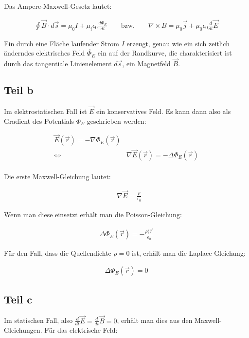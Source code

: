 \documentclass[a4paper,german,12pt,smallheadings]{scrartcl}
\begin{document}
Das Ampere-Maxwell-Gesetz lautet:

\begin{align*}
  \oint \vec{B} \cdot d\vec{s} = \mu_0 I + \mu_i \epsilon_0 \frac{d\Phi_{E}}{dt} \qquad\text{bzw.}\qquad \nabla \times B = \mu_0 \vec{j} + \mu_0 \epsilon_0 \frac{d}{dt} \vec{E}
\end{align*}

Ein durch eine Fläche laufender Strom $I$ erzeugt, genau wie ein sich zeitlich
änderndes elektrisches Feld $\dot{\Phi_{E}}$ ein auf der Randkurve, die
charakterisiert ist durch das tangentiale Linienelement $d\vec{s}$, ein
Magnetfeld $\vec{B}$.

\subsection*{Teil b}

Im elektrostatischen Fall ist $\vec{E}$ ein konservatives Feld. Es kann dann
also als Gradient des Potentials $\Phi_{E}$ geschrieben werden:

\begin{align*}
  \vec{E}(\vec{r}) = -\nabla \Phi_{E}(\vec{r}) \\
  \Leftrightarrow\quad&\nabla \vec{E}(\vec{r}) = -\Delta \Phi_{E}(\vec{r}) \\
\end{align*}

Die erste Maxwell-Gleichung lautet:

\begin{align*}
  &\nabla \vec{E} = \frac{\rho}{\epsilon_0}
\end{align*}

Wenn man diese einsetzt erhält man die Poisson-Gleichung:

\begin{align*}
  \Delta \Phi_{E}(\vec{r}) = -\frac{\rho(\vec{r}}{\epsilon_0}
\end{align*}

Für den Fall, dass die Quellendichte $\rho = 0$ ist, erhält man die
Laplace-Gleichung:

\begin{align*}
  \Delta \Phi_{E}(\vec{r}) = 0
\end{align*}

\subsection*{Teil c}
Im statischen Fall, also $\frac{d}{dt} \vec{E} = \frac{d}{dt} \vec{B} = 0$,
erhält man dies aus den Maxwell-Gleichungen. Für das elektrische Feld:
\end{document}
